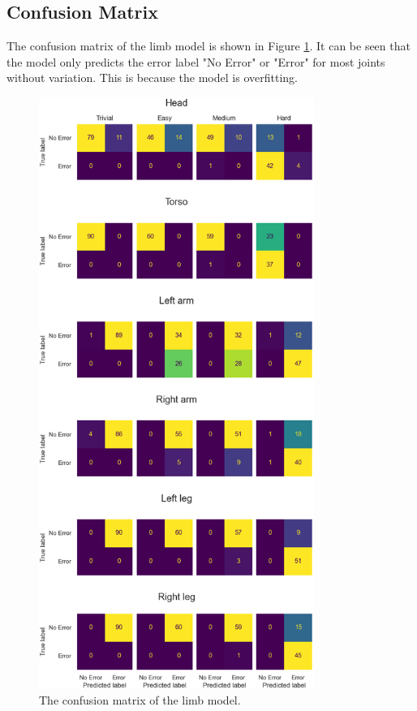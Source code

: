 \subsection{Confusion Matrix}

The confusion matrix of the limb model is shown in Figure \ref{fig:limb_confusion_matrix}. It can be seen that the model only predicts the error label "No Error" or "Error" for most joints without variation. This is because the model is overfitting.

\begin{figure}
  \centering
  \includegraphics[width=0.8\textwidth]{figures/results/confusion/limbs.png}
  \caption[Limb model confusion matrix]{The confusion matrix of the limb model.}
  \label{fig:limb_confusion_matrix}
\end{figure}

